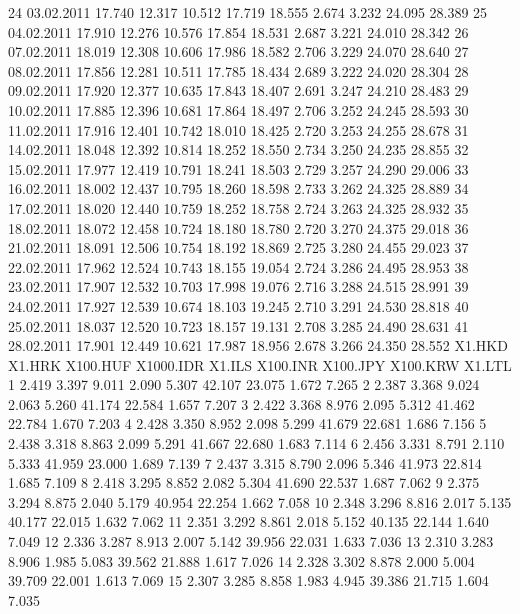 \documentclass[a4paper,11pt]{scrartcl}
\begin{document}
\begin{Schunk}
\begin{Soutput}
24 03.02.2011 17.740 12.317 10.512 17.719 18.555  2.674  3.232 24.095 28.389
25 04.02.2011 17.910 12.276 10.576 17.854 18.531  2.687  3.221 24.010 28.342
26 07.02.2011 18.019 12.308 10.606 17.986 18.582  2.706  3.229 24.070 28.640
27 08.02.2011 17.856 12.281 10.511 17.785 18.434  2.689  3.222 24.020 28.304
28 09.02.2011 17.920 12.377 10.635 17.843 18.407  2.691  3.247 24.210 28.483
29 10.02.2011 17.885 12.396 10.681 17.864 18.497  2.706  3.252 24.245 28.593
30 11.02.2011 17.916 12.401 10.742 18.010 18.425  2.720  3.253 24.255 28.678
31 14.02.2011 18.048 12.392 10.814 18.252 18.550  2.734  3.250 24.235 28.855
32 15.02.2011 17.977 12.419 10.791 18.241 18.503  2.729  3.257 24.290 29.006
33 16.02.2011 18.002 12.437 10.795 18.260 18.598  2.733  3.262 24.325 28.889
34 17.02.2011 18.020 12.440 10.759 18.252 18.758  2.724  3.263 24.325 28.932
35 18.02.2011 18.072 12.458 10.724 18.180 18.780  2.720  3.270 24.375 29.018
36 21.02.2011 18.091 12.506 10.754 18.192 18.869  2.725  3.280 24.455 29.023
37 22.02.2011 17.962 12.524 10.743 18.155 19.054  2.724  3.286 24.495 28.953
38 23.02.2011 17.907 12.532 10.703 17.998 19.076  2.716  3.288 24.515 28.991
39 24.02.2011 17.927 12.539 10.674 18.103 19.245  2.710  3.291 24.530 28.818
40 25.02.2011 18.037 12.520 10.723 18.157 19.131  2.708  3.285 24.490 28.631
41 28.02.2011 17.901 12.449 10.621 17.987 18.956  2.678  3.266 24.350 28.552
   X1.HKD X1.HRK X100.HUF X1000.IDR X1.ILS X100.INR X100.JPY X100.KRW X1.LTL
1   2.419  3.397    9.011     2.090  5.307   42.107   23.075    1.672  7.265
2   2.387  3.368    9.024     2.063  5.260   41.174   22.584    1.657  7.207
3   2.422  3.368    8.976     2.095  5.312   41.462   22.784    1.670  7.203
4   2.428  3.350    8.952     2.098  5.299   41.679   22.681    1.686  7.156
5   2.438  3.318    8.863     2.099  5.291   41.667   22.680    1.683  7.114
6   2.456  3.331    8.791     2.110  5.333   41.959   23.000    1.689  7.139
7   2.437  3.315    8.790     2.096  5.346   41.973   22.814    1.685  7.109
8   2.418  3.295    8.852     2.082  5.304   41.690   22.537    1.687  7.062
9   2.375  3.294    8.875     2.040  5.179   40.954   22.254    1.662  7.058
10  2.348  3.296    8.816     2.017  5.135   40.177   22.015    1.632  7.062
11  2.351  3.292    8.861     2.018  5.152   40.135   22.144    1.640  7.049
12  2.336  3.287    8.913     2.007  5.142   39.956   22.031    1.633  7.036
13  2.310  3.283    8.906     1.985  5.083   39.562   21.888    1.617  7.026
14  2.328  3.302    8.878     2.000  5.004   39.709   22.001    1.613  7.069
15  2.307  3.285    8.858     1.983  4.945   39.386   21.715    1.604  7.035

\end{Soutput}
\end{Schunk}
\end{document}
